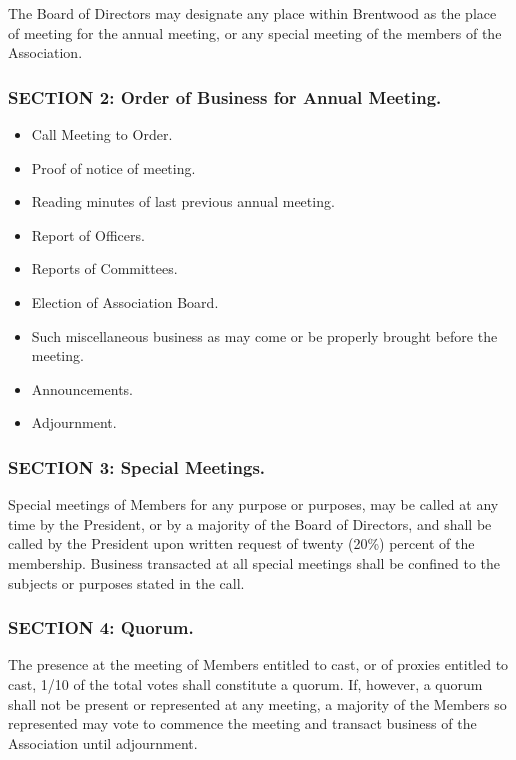 The Board of Directors may designate any place within Brentwood as the
place of meeting for the annual meeting, or any special meeting of the
members of the Association.

\subsubsection{SECTION 2: Order of Business for Annual Meeting.}

\begin{itemize}
\item Call Meeting to Order.

\item Proof of notice of meeting.

\item Reading minutes of last previous annual meeting.

\item Report of Officers.

\item Reports of Committees.

\item Election of Association Board.

\item Such miscellaneous business as may come or be properly brought
before the meeting.

\item Announcements.

\item Adjournment.

\end{itemize}


\subsubsection{SECTION 3: Special Meetings.}
Special meetings of Members for any purpose or purposes, may be called at
any time by the President, or by a majority of the Board of Directors,
and shall be called by the President upon written request of twenty
(20\%) percent of the membership. Business transacted at all special
meetings shall be confined to the subjects or purposes stated in the call.


\subsubsection{SECTION 4: Quorum.}
The presence at the meeting of Members entitled to cast, or of proxies
entitled to cast, 1/10 of the total votes shall constitute a quorum. If,
however, a quorum shall not be present or represented at any meeting,
a majority of the Members so represented may vote to commence the meeting
and transact business of the Association until adjournment.

